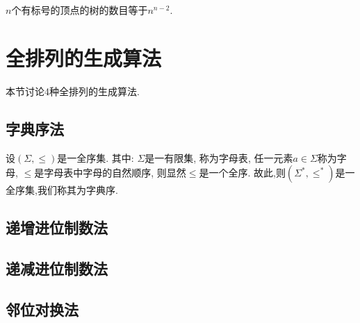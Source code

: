     \begin{theorem}[Cayley定理] \rm
        $n$个有标号的顶点的树的数目等于$n^{n-2}$.
    \end{theorem}

\section{全排列的生成算法}

    本节讨论4种全排列的生成算法.

    \subsection{字典序法}

        \begin{definition}[字典序]
            设$(\Sigma,\leqslant)$是一全序集. 其中: $\Sigma$是一有限集, 称为\textsf{字母表}, 任一元素$a\in\Sigma$称为\textsf{字母}, $\leqslant$是字母表中字母的\textsf{自然顺序}, 则显然$\leqslant$是一个\textsf{全序}. 故此,则$(\Sigma^*,\leqslant^*)$是一\textsf{全序集},我们称其为\textsf{字典序}. 
        \end{definition}

    \subsection{递增进位制数法}

    \subsection{递减进位制数法}

    \subsection{邻位对换法}


